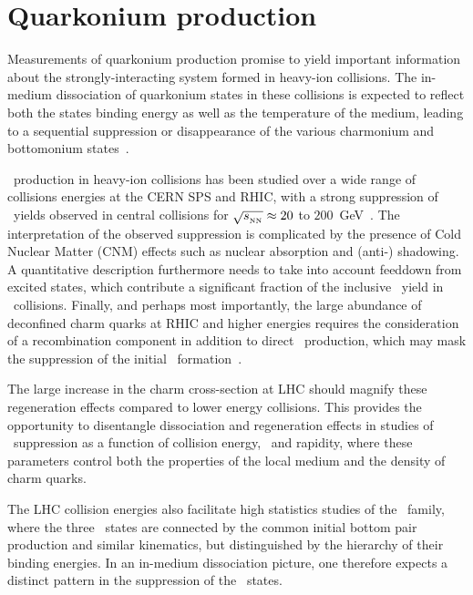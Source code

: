 \section{Quarkonium production}
\label{sec:qurkonia}
Measurements of quarkonium production promise to yield important information about the
strongly-interacting system formed in heavy-ion collisions.  
The in-medium dissociation of quarkonium states
in these collisions is expected to reflect both the states binding energy as
well as the temperature of the medium, leading to a sequential suppression or 
disappearance of the various charmonium and 
bottomonium states~\cite{Matsui:1986dk,Digal:2001ue,Mocsy:2007jz}.

\jpsi\ production in heavy-ion collisions has been studied over a wide range of
collisions energies at the CERN SPS and RHIC, with a strong suppression of \jpsi\
yields observed in central collisions for $\sqrt{s_{_{\rm NN}}} \approx 20$ to
$200$~GeV~\cite{Baglin:1994ui,Alessandro:2004ap,Alessandro:2006ju,Adare:2006ns,
Arnaldi:2007zz,Adare:2011yf}.
The interpretation of the observed suppression is complicated by the presence
of Cold Nuclear Matter (CNM) effects such as nuclear absorption and (anti-) shadowing. A quantitative
description furthermore needs to take into account feeddown from excited states,
which contribute a significant fraction of the inclusive \jpsi\ yield in \pp\ collisions.
Finally, and perhaps most importantly, the large abundance of deconfined charm quarks
at RHIC and higher energies requires the consideration of a recombination component
in addition to direct \jpsi\ production, which may mask the suppression of the initial
\jpsi\ formation~\cite{BraunMunzinger:2000px,Thews:2000rj,Andronic:2007bi,Zhao:2007hh,Capella:2007jv}.

The large increase in the charm cross-section at LHC should magnify these regeneration
effects compared to lower energy collisions. This provides the opportunity to disentangle
dissociation and regeneration effects in studies of \jpsi\ suppression
as a function of collision energy, \pT\ and rapidity, where these parameters
control both the properties of the local medium and the density of charm quarks.

The LHC collision energies also facilitate high statistics studies of the \PgU\ family, where
the three \PgUn\ states are connected by the common initial bottom pair production and
similar kinematics, but distinguished by the hierarchy of their binding energies. In an
in-medium dissociation picture, one therefore expects a distinct pattern in the suppression
of the \PgUn\ states.

